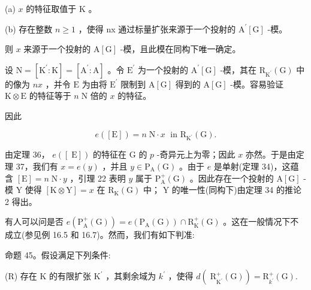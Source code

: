 \documentclass[10pt]{article}
\begin{document}
(a) \(x\) 的特征取值于 \(\mathrm{K}\) 。

(b) 存在整数 \(n \geq  1\) ，使得 nx 通过标量扩张来源于一个投射的 \({\mathrm{A}}^{\prime }\left\lbrack  \mathrm{G}\right\rbrack\) -模。

则 \(x\) 来源于一个投射的 \(\mathrm{A}\left\lbrack  \mathrm{G}\right\rbrack\) -模，且此模在同构下唯一确定。

设 \(\mathrm{N} = \left\lbrack  {{\mathrm{K}}^{\prime } : \mathrm{K}}\right\rbrack   = \left\lbrack  {{\mathrm{A}}^{\prime } : \mathrm{A}}\right\rbrack\) 。令 \({\mathrm{E}}^{\prime }\) 为一个投射的 \({\mathrm{A}}^{\prime }\left\lbrack  \mathrm{G}\right\rbrack\) -模，其在 \({\mathrm{R}}_{{\mathrm{K}}^{\prime }}\left( \mathrm{G}\right)\) 中的像为 \({nx}\) ，并令 \(\mathrm{E}\) 为由将 \({\mathrm{E}}^{\prime }\) 限制到 \(\mathrm{A}\left\lbrack  \mathrm{G}\right\rbrack\) 得到的 \(\mathrm{A}\left\lbrack  \mathrm{G}\right\rbrack\) -模。容易验证 \(\mathrm{K} \otimes  \mathrm{E}\) 的特征等于 \(n\mathrm{\;N}\) 倍的 \(x\) 的特征。

因此

\[
e\left( \left\lbrack  \mathrm{E}\right\rbrack  \right)  = n\mathrm{\;N} \cdot  x\;\text{ in }{\mathrm{R}}_{{\mathrm{K}}^{\prime }}\left( \mathrm{G}\right) .
\]

由定理 36， \(e\left( \left\lbrack  \mathrm{\;E}\right\rbrack  \right)\) 的特征在 \(\mathrm{G}\) 的 \(p\) -奇异元上为零；因此 \(x\) 亦然。于是由定理 37，我们有 \(x = e\left( y\right)\) ，并且 \(y \in  {\mathrm{P}}_{\mathrm{A}}\left( \mathrm{G}\right)\) 。由于 \(e\) 是单射(定理 34)，这蕴含 \(\left\lbrack  \mathrm{E}\right\rbrack   = n\mathrm{\;N} \cdot  y\) ，引理 22 表明 \(y\) 属于 \({\mathrm{P}}_{\mathrm{A}}^{ + }\left( \mathrm{G}\right)\) 。因此存在一个投射的 \(\mathrm{A}\left\lbrack  \mathrm{G}\right\rbrack\) -模 \(\mathrm{Y}\) 使得 \(\left\lbrack  {\mathrm{K} \otimes  \mathrm{Y}}\right\rbrack   = x\) 在 \({\mathrm{R}}_{\mathrm{K}}\left( \mathrm{G}\right)\) 中； \(\mathrm{Y}\) 的唯一性(同构下)由定理 34 的推论 2 得出。

有人可以问是否 \(e\left( {{\mathrm{P}}_{\mathrm{A}}^{ + }\left( \mathrm{G}\right) }\right)  = e\left( {{\mathrm{P}}_{\mathrm{A}}\left( \mathrm{G}\right) }\right)  \cap  {\mathrm{R}}_{\mathrm{K}}^{ + }\left( \mathrm{G}\right)\) 。这在一般情况下不成立(参见例 16.5 和 16.7)。然而，我们有如下判准:

命题 45。假设满足下列条件:

(R) 存在 \(\mathrm{K}\) 的有限扩张 \({\mathrm{K}}^{\prime }\) ，其剩余域为 \({k}^{\prime }\) ，使得 \(d\left( {{\mathrm{\;R}}_{{\mathrm{K}}^{\prime }}^{ + }\left( \mathrm{G}\right) }\right)  = {\mathrm{R}}_{{k}^{\prime }}^{ + }\left( \mathrm{G}\right) .\)
\end{document}
